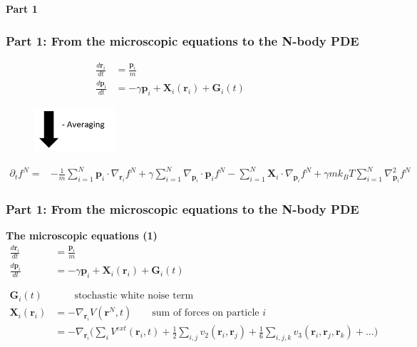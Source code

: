 \documentclass[aspectratio=169,xcolor=dvipsnames]{beamer}
\begin{document}
\begin{frame}
	\centering
	\textbf{ \huge Part 1}
\end{frame}
\begin{frame}
	\frametitle{Part 1: From the microscopic equations to the N-body PDE}
	
	\begin{align*}
	\frac{d \mathbf{r}_i}{dt} &= \frac{\mathbf{p}_i}{m}\\
	\frac{d \mathbf{p}_i}{dt} &= - \gamma \mathbf{p}_i + \mathbf{X}_i(\mathbf{r}_i) + \mathbf{G}_i(t) \qquad \quad
	\end{align*}
	\vspace{-0.5cm}
	\begin{figure}
		\includegraphics[width=3cm]{Arrow2.png}
	\end{figure}
	\vspace{-0.3cm}
	\begin{align*}
	\partial_t f^N = &- \frac{1}{m} \sum_{i=1}^N \mathbf{p}_i \cdot \nabla_{\mathbf{r}_i} f^N + \gamma \sum_{i = 1}^N \nabla_{\mathbf{p}_i}
	\cdot \mathbf{p}_i f^N - \sum_{i=1}^N \mathbf{X}_i \cdot \nabla_{\mathbf{p}_i}f^N + \gamma m k_BT \sum_{i=1}^N \nabla^2_{\mathbf{p}_i}f^N	
	\end{align*}
	
\end{frame}
\begin{frame}
	\frametitle{Part 1: From the microscopic equations to the N-body PDE}
	\textbf{The microscopic equations (1)}
	\vspace{0.2cm}
    \begin{align*}
	\frac{d \mathbf{r}_i}{dt} &= \frac{\mathbf{p}_i}{m}\\
	\frac{d \mathbf{p}_i}{dt} &= - \gamma \mathbf{p}_i + \mathbf{X}_i(\mathbf{r}_i) + \mathbf{G}_i(t) \qquad \quad\\
	\\
	\\
	\mathbf{G}_i(t) &\qquad \text{stochastic white noise term}\\
	\mathbf{X}_i(\mathbf{r}_i) &= - \nabla_{\mathbf{r}_i} V(\mathbf{r}^N,t) \qquad \text{sum of forces on particle } i\\
        &= - \nabla_{\mathbf{r}_i} \bigg(\sum_i V^{ext}(\mathbf{r}_i,t) + \frac{1}{2} \sum_{i,j} v_2(\mathbf{r}_i, \mathbf{r}_j)+ \frac{1}{6} \sum_{i,j,k} v_3 (\mathbf{r}_i, \mathbf{r}_j, \mathbf{r}_k) + ... \bigg)
	\end{align*}
\end{frame}
\end{document}
